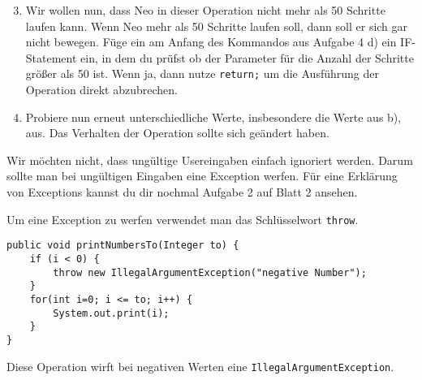\begin{enumerate}\setcounter{enumi}{2}
	\item
		Wir wollen nun, dass Neo in dieser Operation nicht mehr als 50 Schritte laufen kann. 
		Wenn Neo mehr als 50 Schritte laufen soll, dann soll er sich gar nicht bewegen.
		Füge ein am Anfang des Kommandos aus Aufgabe 4 d) ein IF-Statement ein, in dem du prüfst ob der Parameter für die Anzahl der Schritte größer als 50 ist.
		Wenn ja, dann nutze \lstinline{return;} um die Ausführung der Operation direkt abzubrechen.

	\item
		Probiere nun erneut unterschiedliche Werte, insbesondere die Werte aus b), aus.
		Das Verhalten der Operation sollte sich geändert haben.
\end{enumerate}

\medskip %

\begin{Infobox}
	Wir möchten nicht, dass ungültige Usereingaben einfach ignoriert werden. 
	Darum sollte man bei ungültigen Eingaben eine Exception werfen.
	Für eine Erklärung von Exceptions kannst du dir nochmal Aufgabe 2 auf Blatt 2 ansehen.

	Um eine Exception zu werfen verwendet man das Schlüsselwort \lstinline{throw}.

	\begin{lstlisting}[xleftmargin=0.5cm]
public void printNumbersTo(Integer to) {
    if (i < 0) {
        throw new IllegalArgumentException("negative Number");	
    }
    for(int i=0; i <= to; i++) {
        System.out.print(i);
    }
}
	\end{lstlisting}
	
	Diese Operation wirft bei negativen Werten eine \lstinline{IllegalArgumentException}.
\end{Infobox}


